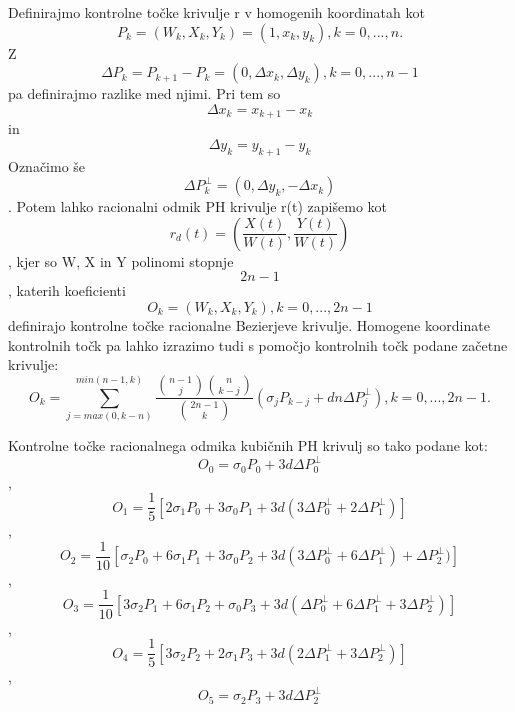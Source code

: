 \documentclass[12pt]{article}
\begin{document}
Definirajmo kontrolne točke krivulje r v homogenih koordinatah kot
$$ P_k = (W_k, X_k, Y_k) = (1, x_k, y_k), k = 0, ..., n.$$
Z $$\Delta P_k = P_{k+1}-P_k = (0, \Delta x_k, \Delta y_k), k = 0, ..., n-1$$ 
pa definirajmo razlike med njimi. Pri tem so $$\Delta x_k = x_{k+1} - x_k$$ in $$\Delta y_k = y_{k+1} - y_k$$
Označimo še $$ \Delta P_k^{\perp} = (0, \Delta y_k, - \Delta x_k)$$. Potem lahko
racionalni odmik PH krivulje r(t) zapišemo kot
$$ r_d(t) = (\frac{X(t)}{W(t)}, \frac{Y(t)}{W(t)})$$,
kjer so W, X in Y polinomi stopnje $$2n -1$$, katerih koeficienti 
$$ O_k = (W_k, X_k, Y_k), k = 0, ..., 2n-1$$
definirajo kontrolne točke racionalne Bezierjeve krivulje. 
Homogene koordinate kontrolnih točk pa lahko izrazimo tudi s pomočjo kontrolnih točk podane začetne krivulje:
$$ O_k = \sum_{j=max(0,k-n)}^{min(n-1,k)}{\frac{\binom{n-1}{j}\binom{n}{k-j}}{\binom{2n-1}{k}}(\sigma_j P_{k-j}+d n \Delta P^{\perp}_{j})}, k = 0, ..., 2n-1.$$

Kontrolne točke racionalnega odmika kubičnih PH krivulj so tako podane kot:
$$ O_0 = \sigma_0 P_0 + 3 d \Delta P_0^{\perp}$$,
$$ O_1 = \frac{1}{5} [2 \sigma_1 P_0 + 3\sigma_0 P_1 + 3 d (3 \Delta P_0^{\perp} + 2 \Delta P_1^{\perp})]$$,
$$ O_2 = \frac{1}{10} [\sigma_2 P_0 + 6\sigma_1 P_1 + 3\sigma_0 P_2 + 3 d (3 \Delta P_0^{\perp} + 6 \Delta P_1^{\perp}) + \Delta P_2^{\perp})]$$,
$$ O_3 = \frac{1}{10} [3\sigma_2 P_1 + 6\sigma_1 P_2 + \sigma_0 P_3 + 3 d (\Delta P_0^{\perp} + 6 \Delta P_1^{\perp} + 3 \Delta P_2^{\perp})]$$,
$$ O_4 = \frac{1}{5} [3\sigma_2 P_2 + 2\sigma_1 P_3 + 3 d (2\Delta P_1^{\perp} + 3 \Delta P_2^{\perp})]$$,
$$ O_5 = \sigma_2 P_3 + 3 d \Delta P_2^{\perp}$$
\end{document}
